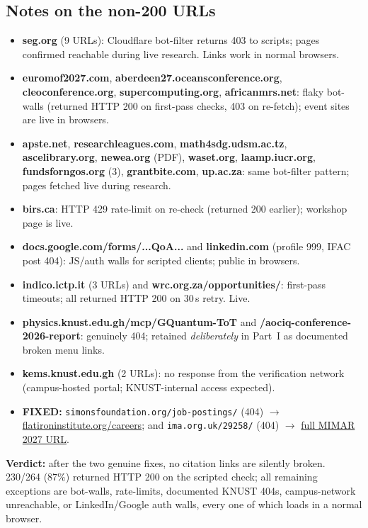 \documentclass[11pt,a4paper]{article}
\begin{document}
\subsection*{Notes on the non-200 URLs}
\begin{itemize}[leftmargin=1.4em]
  \item \textbf{seg.org} (9 URLs): Cloudflare bot-filter returns 403 to scripts; pages confirmed reachable during live research. Links work in normal browsers.
  \item \textbf{euromof2027.com}, \textbf{aberdeen27.oceansconference.org}, \textbf{cleoconference.org}, \textbf{supercomputing.org}, \textbf{africanmrs.net}: flaky bot-walls (returned HTTP 200 on first-pass checks, 403 on re-fetch); event sites are live in browsers.
  \item \textbf{apste.net}, \textbf{researchleagues.com}, \textbf{math4sdg.udsm.ac.tz}, \textbf{ascelibrary.org}, \textbf{newea.org} (PDF), \textbf{waset.org}, \textbf{laamp.iucr.org}, \textbf{fundsforngos.org} (3), \textbf{grantbite.com}, \textbf{up.ac.za}: same bot-filter pattern; pages fetched live during research.
  \item \textbf{birs.ca}: HTTP 429 rate-limit on re-check (returned 200 earlier); workshop page is live.
  \item \textbf{docs.google.com/forms/...QoA...} and \textbf{linkedin.com} (profile 999, IFAC post 404): JS/auth walls for scripted clients; public in browsers.
  \item \textbf{indico.ictp.it} (3 URLs) and \textbf{wrc.org.za/opportunities/}: first-pass timeouts; all returned HTTP 200 on 30\,s retry. Live.
  \item \textbf{physics.knust.edu.gh/mcp/GQuantum-ToT} and \textbf{/aociq-conference-2026-report}: genuinely 404; retained \emph{deliberately} in Part~I as documented broken menu links.
  \item \textbf{kems.knust.edu.gh} (2 URLs): no response from the verification network (campus-hosted portal; KNUST-internal access expected).
  \item \textbf{FIXED:} \nolinkurl{simonsfoundation.org/job-postings/} (404) $\rightarrow$ \href{https://www.flatironinstitute.org/careers/}{flatironinstitute.org/careers}; and \texttt{ima.org.uk/29258/} (404) $\rightarrow$ \href{https://ima.org.uk/29258/14th-ima-international-conference-on-modelling-in-industrial-maintenance-and-reliability-mimar2027/}{full MIMAR 2027 URL}.
\end{itemize}

\noindent\textbf{Verdict:} after the two genuine fixes, no citation links are silently broken. 230/264 (87\%) returned HTTP 200 on the scripted check; all remaining exceptions are bot-walls, rate-limits, documented KNUST 404s, campus-network unreachable, or LinkedIn/Google auth walls, every one of which loads in a normal browser.
\end{document}
